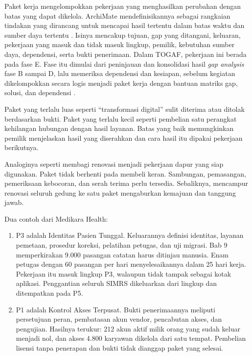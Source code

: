 Paket kerja mengelompokkan pekerjaan yang menghasilkan perubahan dengan batas yang dapat
dikelola. ArchiMate mendefinisikannya sebagai rangkaian tindakan yang dirancang untuk
mencapai hasil tertentu dalam batas waktu dan sumber daya tertentu \cite{archimate32}.
Isinya mencakup tujuan, gap yang ditangani, keluaran, pekerjaan yang masuk dan tidak masuk
lingkup, pemilik, kebutuhan sumber daya, dependensi, serta bukti penerimaan. Dalam TOGAF,
pekerjaan ini berada pada fase E. Fase itu dimulai dari peninjauan dan konsolidasi hasil
\textit{gap analysis} fase B sampai D, lalu memeriksa dependensi dan kesiapan, sebelum
kegiatan dikelompokkan secara logis menjadi paket kerja dengan bantuan matriks gap, solusi,
dan dependensi \cite{c11-togaf-fasee}.

Paket yang terlalu luas seperti ``transformasi digital'' sulit diterima atau ditolak
berdasarkan bukti. Paket yang terlalu kecil seperti pembelian satu perangkat kehilangan
hubungan dengan hasil layanan. Batas yang baik memungkinkan pemilik menjelaskan hasil yang
diserahkan dan cara hasil itu dipakai pekerjaan berikutnya.

Analoginya seperti membagi renovasi menjadi pekerjaan dapur yang siap digunakan. Paket tidak
berhenti pada membeli keran. Sambungan, pemasangan, pemeriksaan kebocoran, dan serah terima
perlu tersedia. Sebaliknya, mencampur renovasi seluruh gedung ke satu paket mengaburkan
kemajuan dan tanggung jawab.

Dua contoh dari Medikara Health:
\begin{enumerate}
  \item P3 adalah Identitas Pasien Tunggal. Keluarannya definisi identitas, layanan pemetaan,
        prosedur koreksi, pelatihan petugas, dan uji migrasi. Bab 9 memperkirakan 9.000
        pasangan catatan harus ditinjau manusia. Enam petugas dengan 60 pasangan per hari
        menyelesaikannya dalam 25 hari kerja. Pekerjaan itu masuk lingkup P3, walaupun tidak
        tampak sebagai kotak aplikasi. Penggantian seluruh SIMRS dikeluarkan dari lingkup
        dan ditempatkan pada P5.
  \item P1 adalah Kontrol Akses Terpusat. Bukti penerimaannya meliputi persetujuan peran,
        pembatasan akun vendor, pencabutan akses, dan pengujian. Hasilnya terukur: 212 akun
        aktif milik orang yang sudah keluar menjadi nol, dan akses 4.800 karyawan dikelola
        dari satu tempat. Pembelian lisensi tanpa penerapan dan bukti tidak dianggap paket
        yang selesai.
\end{enumerate}

